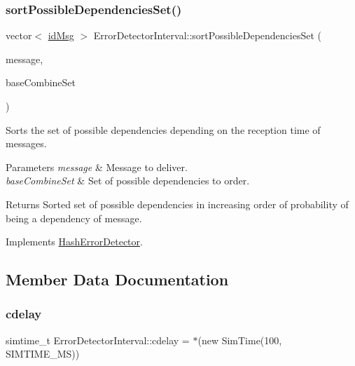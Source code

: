 \subsubsection{\texorpdfstring{sort\+Possible\+Dependencies\+Set()}{sortPossibleDependenciesSet()}}
{\footnotesize\ttfamily vector$<$ \hyperlink{structures_8h_a83a1d9a070efa5341da84cfd8e28d3e5}{id\+Msg} $>$ Error\+Detector\+Interval\+::sort\+Possible\+Dependencies\+Set (\begin{DoxyParamCaption}\item[{const \hyperlink{structures_8h_a7e7bdc1d2fff8a9436f2f352b2711ed6}{message\+Info} \&}]{message,  }\item[{const vector$<$ \hyperlink{structures_8h_a7e7bdc1d2fff8a9436f2f352b2711ed6}{message\+Info} $>$ \&}]{base\+Combine\+Set }\end{DoxyParamCaption})\hspace{0.3cm}{\ttfamily [virtual]}}



Sorts the set of possible dependencies depending on the reception time of messages. 


\begin{DoxyParams}{Parameters}
{\em message} & Message to deliver. \\
\hline
{\em base\+Combine\+Set} & Set of possible dependencies to order. \\
\hline
\end{DoxyParams}
\begin{DoxyReturn}{Returns}
Sorted set of possible dependencies in increasing order of probability of being a dependency of message. 
\end{DoxyReturn}


Implements \hyperlink{class_hash_error_detector_aa7952b99e47ca7cef6dae2a271885599}{Hash\+Error\+Detector}.



\subsection{Member Data Documentation}
\mbox{\label{class_error_detector_interval_adb614477095a1b9753f088f28776c677}} 
\subsubsection{\texorpdfstring{cdelay}{cdelay}}
{\footnotesize\ttfamily simtime\+\_\+t Error\+Detector\+Interval\+::cdelay = $\ast$(new Sim\+Time(100, S\+I\+M\+T\+I\+M\+E\+\_\+\+MS))\hspace{0.3cm}{\ttfamily [private]}}



